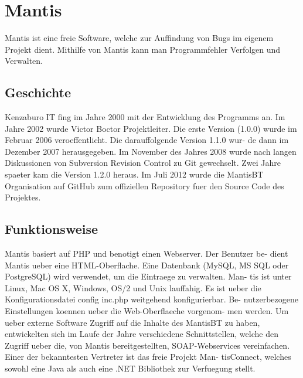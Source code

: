 \section{Mantis}
Mantis ist eine freie Software, welche zur Auffindung von Bugs im eigenem
Projekt dient. Mithilfe von Mantis kann man Programmfehler Verfolgen und
Verwalten.
\subsection{Geschichte}
Kenzaburo IT fing im Jahre 2000 mit der Entwicklung des Programms an.
Im Jahre 2002 wurde Victor Boctor Projektleiter. Die erste Version (1.0.0)
wurde im Februar 2006 veroeffentlicht. Die darauffolgende Version 1.1.0 wur-
de dann im Dezember 2007 herausgegeben. Im November des Jahres 2008
wurde nach langen Diskussionen von Subversion Revision Control zu Git
gewechselt. Zwei Jahre spaeter kam die Version 1.2.0 heraus. Im Juli 2012
wurde die MantisBT Organisation auf GitHub zum offiziellen Repository
fuer den Source Code des Projektes.
\subsection{Funktionsweise}
Mantis basiert auf PHP und benotigt einen Webserver. Der Benutzer be-
dient Mantis ueber eine HTML-Oberflache. Eine Datenbank (MySQL, MS
SQL oder PostgreSQL) wird verwendet, um die Eintraege zu verwalten. Man-
tis ist unter Linux, Mac OS X, Windows, OS/2 und Unix lauffahig. Es ist
ueber die Konfigurationsdatei config inc.php weitgehend konfigurierbar. Be-
nutzerbezogene Einstellungen koennen ueber die Web-Oberflaeche vorgenom-
men werden. Um ueber externe Software Zugriff auf die Inhalte des MantisBT
zu haben, entwickelten sich im Laufe der Jahre verschiedene Schnittstellen,
welche den Zugriff ueber die, von Mantis bereitgestellten, SOAP-Webservices
vereinfachen. Einer der bekanntesten Vertreter ist das freie Projekt Man-
tisConnect, welches sowohl eine Java als auch eine .NET Bibliothek zur
Verfuegung stellt.
